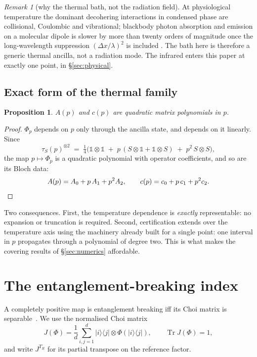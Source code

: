 \documentclass[11pt,a4paper]{article}
\newtheorem{proposition}[theorem]{Proposition}
\theoremstyle{definition}
\theoremstyle{remark}
\newtheorem{remark}[theorem]{Remark}
\DeclareMathOperator{\Tr}{Tr}
\newcommand{\I}{\mathbb{1}}
\providecommand{\ket}[1]{|#1\rangle}
\providecommand{\bra}[1]{\langle#1|}
\begin{document}
\begin{remark}[why the thermal bath, not the radiation field]
At physiological temperature the dominant decohering interactions in condensed phase are collisional, Coulombic and vibrational; blackbody photon absorption and emission on a molecular dipole is slower by more than twenty orders of magnitude once the long-wavelength suppression $(\Delta x/\lambda)^2$ is included \cite{Tegmark2000,Schlosshauer2019}. The bath here is therefore a generic thermal ancilla, not a radiation mode. The infrared enters this paper at exactly one point, in \S\ref{sec:physical}.
\end{remark}

\subsection{Exact form of the thermal family}

\begin{proposition}\label{prop:quadratic}
$A(p)$ and $c(p)$ are quadratic matrix polynomials in $p$.
\end{proposition}

\begin{proof}
$\Phi_p$ depends on $p$ only through the ancilla state, and depends on it linearly. Since
\[
  \tau_S(p)^{\otimes 2} \;=\; \tfrac14\Big(\I\otimes\I \;+\; p\,(S\otimes\I + \I\otimes S) \;+\; p^{2}\, S\otimes S\Big),
\]
the map $p \mapsto \Phi_p$ is a quadratic polynomial with operator coefficients, and so are its Bloch data:
\[
  A(p) = A_0 + p\,A_1 + p^2 A_2, \qquad c(p) = c_0 + p\,c_1 + p^2 c_2. \qedhere
\]
\end{proof}

Two consequences. First, the temperature dependence is \emph{exactly} representable: no expansion or truncation is required. Second, certification extends over the temperature axis using the machinery already built for a single point: one interval in $p$ propagates through a polynomial of degree two. This is what makes the covering results of \S\ref{sec:numerics} affordable.

\section{The entanglement-breaking index}
\label{sec:index}

A completely positive map is entanglement breaking iff its Choi matrix is
separable~\cite{HSR2003}. We use the normalised Choi matrix
\begin{equation}\label{eq:choi}
  J(\Phi)=\frac1d\sum_{i,j=1}^{d}\ket{i}\bra{j}\otimes\Phi(\ket{i}\bra{j}),
  \qquad \Tr J(\Phi)=1,
\end{equation}
and write $J^{T_{R}}$ for its partial transpose on the reference factor.
\end{document}
